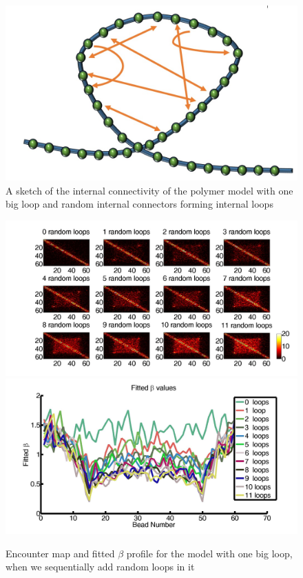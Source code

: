\documentclass[12pt]{paper}
\begin{document}
\begin{figure}
\includegraphics[scale=0.3]{polymerModelWithLoopAndInternalConnectors}
\caption{A sketch of the internal connectivity of the polymer model with one big loop and random internal connectors forming internal loops}
\label{figure_randomLoopSketch}
\end{figure}


\begin{figure}[H]
\includegraphics[scale=0.2]{encounterHistogram_randomInternalLoops64BeadChain}
\includegraphics[scale=0.2]{fittedExpOneTADWithTails64Beads1To11Loops}
\caption{Encounter map and fitted $\beta$ profile for the model with one big loop, when we sequentially add random loops in it}
\label{figure_randomLoopsOneTAD}
\end{figure}
\end{document}

